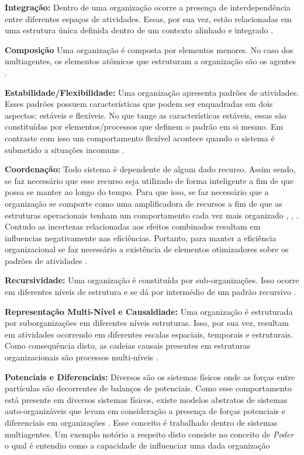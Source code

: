 \textbf{Integração:} Dentro de uma organização ocorre a presença de interdependência entre diferentes espaços de atividades. Essas, por sua vez, estão relacionadas em uma estrutura única definida dentro de um contexto alinhado e integrado \cite{organiationofmultiagentsystem}.

\textbf{Composição} Uma organização é composta por elementos menores. No caso dos multiagentes, os elementos atômicos que estruturam a organização são os agentes \cite{organiationofmultiagentsystem}.

\textbf{Estabilidade/Flexibilidade:} Uma organização apresenta padrões de atividades. Esses padrões possuem características que podem ser enquadradas em dois aspectos; estáveis e flexíveis. No que tange as características estáveis, essas são constituídas por elementos/processos que definem o padrão em si mesmo. Em contraste com isso um comportamento flexível acontece quando o sistema é submetido a situações incomuns \cite{organiationofmultiagentsystem}.

\textbf{Coordenação:} Todo sistema é dependente de algum dado recurso. Assim sendo, se faz necessário que esse recurso seja utilizado de forma inteligente a fim de que possa se manter ao longo do tempo. Para que isso, se faz necessário que a organização se comporte como uma amplificadora de recursos a fim de que as estruturas operacionais tenham um comportamento cada vez mais organizado 
\cite{selforganization}, \cite{selforganizatioenvoriment}, \cite{defintionselforganization}. Contudo as incertezas relacionadas aos efeitos combinados resultam em influencias negativamente nas eficiências. Portanto, para manter a eficiência organizacional se faz necessário a existência de elementos otimizadores sobre os padrões de atividades \cite{organiationofmultiagentsystem}.

\textbf{Recursividade:} Uma organização é constituída por sub-organizações. Isso ocorre em diferentes níveis de estrutura e se dá por intermédio de um padrão recursivo \cite{organiationofmultiagentsystem}.

\textbf{Representação Multi-Nível e Causaldiade:} Uma organização é estruturada por suborganizações em diferentes níveis estruturas. Isso, por sua vez, resultam em atividades ocorrendo em diferentes escalas espaciais, temporais e estruturais. Como consequência disto, as cadeias causais presentes em estruturas organizacionais são processos multi-níveis \cite{organiationofmultiagentsystem}.

\textbf{Potenciais e Diferenciais:} Diversos são os sistemas físicos onde as forças entre partículas são decorrentes de balanços de potenciais. Como esse comportamento está presente em diversos sistemas físicos, existe modelos abstratos de sistemas auto-organizáveis que levam em consideração a presença de forças potenciais e diferenciais em organizações \cite{selforganizationdiffforce}. Esse conceito é trabalhado dentro de sistemas multiagentes. Um exemplo notório a respeito disto consiste no conceito de \textit{Poder} o qual é entendio como a capacidade de influenciar uma dada organização \cite{organiationofmultiagentsystem}

